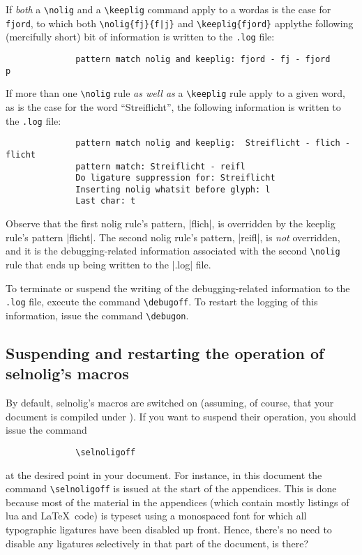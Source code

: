 \documentclass[11pt]{article}
\newcommand{\pkg}[1]{\textsf{#1}}
\newcommand{\opt}[1]{\texttt{#1}}
\newcommand{\cmmd}[1]{\texttt{\textbackslash #1}}
\begin{document}
If \emph{both} a \cmmd{nolig} and a \cmmd{keeplig} command apply to a word\textemdash as is the case for \opt{fjord}, to which both \Verb+\nolig{fj}{f|j}+ and \Verb+\keeplig{fjord}+ apply\textemdash the following (mercifully short) bit of information is written to the \opt{.log} file:
\begin{Verbatim}
              pattern match nolig and keeplig: fjord - fj - fjord
p\end{Verbatim}

If more than one \cmmd{nolig} rule \emph{as well as} a \cmmd{keeplig} rule apply to a given word, as is the case for the word \enquote{Streiflicht}, the following information is written to the \opt{.log} file:
\begin{Verbatim}
              pattern match nolig and keeplig:  Streiflicht - flich - flicht
              pattern match: Streiflicht - reifl
              Do ligature suppression for: Streiflicht
              Inserting nolig whatsit before glyph: l
              Last char: t
\end{Verbatim}

Observe that the first nolig rule's pattern, |flich|, is overridden by the keeplig rule's pattern |flicht|. The second nolig rule's pattern, |reifl|, is \emph{not} overridden, and it is the debugging-related information associated with the second \cmmd{nolig} rule that ends up being written to the |.log| file. 

To terminate or suspend the writing of the debugging-related information to the \opt{.log} file, execute the command \cmmd{debugoff}. To restart the logging of this information, issue the command \cmmd{debugon}.



\subsection[Suspending and restarting the operation of selnolig's macros]{Suspending and restarting the operation of \pkg{selnolig}'s macros} \label{sec:selnoligon}

By default, \pkg{selnolig}'s macros are switched on (assuming, of course, that your document is compiled under \LuaLaTeX). If you want to suspend their operation, you should issue the command
\begin{Verbatim}
              \selnoligoff
\end{Verbatim}
at the desired point in your document. For instance, in this document the command \cmmd{selnoligoff} is issued at the start of the appendices. This is done because most of the material in the appendices (which contain mostly listings of lua and \LaTeX\ code) is typeset using a monospaced font for which all typographic ligatures have been disabled up front. Hence, there's no need to disable any ligatures selectively in that part of the document, is there?
\end{document}
